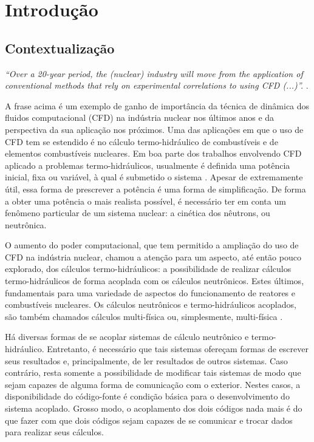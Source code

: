 \chapter{Introdução}
\label{chap:introducao}



\section{Contextualização}

\emph{``Over a 20-year period, the (nuclear) industry will move from 
the application of conventional methods that rely on 
experimental correlations to using CFD (...)''.} \cite[p.~655]{Baglietto2011}.

A frase acima é um exemplo de ganho de importância da técnica de dinâmica dos fluidos 
computacional (CFD) na indústria nuclear nos últimos anos e da perspectiva da sua aplicação 
nos próximos. Uma das aplicações em que o uso de CFD tem se estendido é no cálculo termo-hidráulico
de combustíveis e de elementos combustíveis nucleares. Em boa parte dos trabalhos envolvendo CFD aplicado
a problemas termo-hidráulicos, usualmente é definida uma potência inicial, fixa ou variável, à qual
é submetido o sistema \cite{Ustinenko2008}. Apesar de extremamente útil, essa forma de prescrever a
potência é uma forma de simplificação. De forma a obter uma potência o mais realista possível, é necessário
ter em conta um fenômeno particular de um sistema nuclear: a cinética dos nêutrons, ou neutrônica.

O aumento do poder computacional, que tem permitido a ampliação do uso de CFD na indústria nuclear, chamou a
atenção para um aspecto, até então pouco explorado, dos cálculos termo-hidráulicos: a possibilidade de
realizar cálculos termo-hidráulicos de forma acoplada com os cálculos neutrônicos. Estes últimos, fundamentais para
uma variedade de aspectos do funcionamento de reatores e combustíveis nucleares. Os cálculos neutrônicos e termo-hidráulicos
acoplados, são também chamados cálculos multi-física ou, simplesmente, multi-física \cite{Leppanen2012}. 

Há diversas formas de se acoplar sistemas de cálculo neutrônico e termo-hidráulico. Entretanto, é necessário que tais
sistemas ofereçam formas de escrever seus resultados e, principalmente, de ler resultados de outros sistemas. Caso contrário,
resta somente a possibilidade de modificar tais sistemas de modo que sejam capazes de alguma forma de comunicação com o
exterior. Nestes casos, a disponibilidade do código-fonte é condição básica para o desenvolvimento do sistema acoplado.
Grosso modo, o acoplamento dos dois códigos nada mais é do que fazer com que dois códigos sejam capazes de se comunicar e
trocar dados para realizar seus cálculos.





